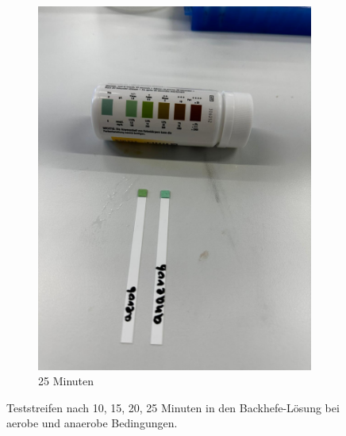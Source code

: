 \documentclass[10pt,a4paper]{article}
\begin{document}
\begin{figure}[H]
\begin{subfigure}[b]{0.4\textwidth}
			\includegraphics[width=\textwidth]{PHOTO-2024-07-04-23-51-29.jpg}
			\caption{25 Minuten}
			\label{fig:25 min}
		\end{subfigure}
		\caption{Teststreifen nach 10, 15, 20, 25 Minuten in den Backhefe-Lösung bei aerobe und anaerobe Bedingungen.}
		\label{fig: Glucoseverbrauch}
	\end{figure}
	
\end{document}
